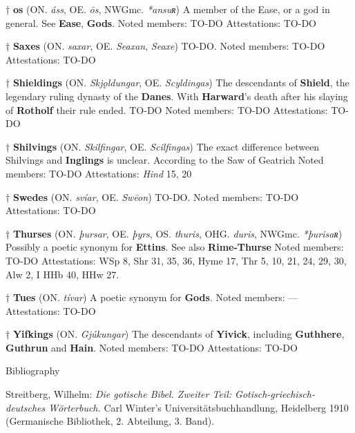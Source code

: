 † \textbf{os} (ON. \emph{áss}, OE. \emph{ōs}, NWGmc. \emph{*ansuʀ})
 A member of the Ease, or a god in general. See \textbf{Ease}, \textbf{Gods}.
 Noted members: TO-DO
 Attestations: TO-DO

† \textbf{Saxes} (ON. \emph{saxar}, OE. \emph{Seaxan}, \emph{Seaxe})
 TO-DO.
 Noted members: TO-DO
 Attestations: TO-DO

† \textbf{Shieldings} (ON. \emph{Skjǫldungar}, OE. \emph{Scyldingas})
 The descendants of \textbf{Shield}, the legendary ruling dynasty of the \textbf{Danes}. With \textbf{Harward}'s death after his slaying of \textbf{Rotholf} their rule ended. TO-DO
 Noted members: TO-DO
 Attestations: TO-DO

† \textbf{Shilvings} (ON. \emph{Skilfingar}, OE. \emph{Scilfingas})
 The exact difference between Shilvings and \textbf{Inglings} is unclear. According to the Saw of Geatrich
 Noted members: TO-DO
 Attestations: \emph{Hind} 15, 20

† \textbf{Swedes} (ON. \emph{svíar}, OE. \emph{Swēon})
 TO-DO.
 Noted members: TO-DO
 Attestations: TO-DO

† \textbf{Thurses} (ON. \emph{þursar}, OE. \emph{þyrs}, OS. \emph{thuris}, OHG. \emph{duris}, NWGmc. \emph{*þurisaʀ})
 Possibly a poetic synonym for \textbf{Ettins}. See also \textbf{Rime-Thurse}
 Noted members: TO-DO
 Attestations: WSp 8, Shr 31, 35, 36, Hyme 17, Thr 5, 10, 21, 24, 29, 30, Alw 2, I HHb 40, HHw 27.
 
 † \textbf{Tues} (ON. \emph{tívar})
 A poetic synonym for \textbf{Gods}.
 Noted members: —
 Attestations: TO-DO

† \textbf{Yifkings} (ON. \emph{Gjúkungar})
 The descendants of \textbf{Yivick}, including \textbf{Guthhere}, \textbf{Guthrun} and \textbf{Hain}.
 Noted members: TO-DO
 Attestations: TO-DO


Bibliography

Streitberg, Wilhelm: \emph{Die gotische Bibel. Zweiter Teil: Gotisch-griechisch-deutsches Wörterbuch.} Carl Winter's Universitätsbuchhandlung, Heidelberg 1910 (Germanische Bibliothek, 2. Abteilung, 3. Band).

